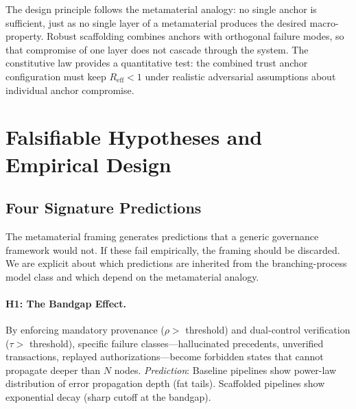 \documentclass[runningheads]{llncs}
\begin{document}
The design principle follows the metamaterial analogy: no single anchor is sufficient, just as no single layer of a metamaterial produces the desired macro-property. Robust scaffolding combines anchors with orthogonal failure modes, so that compromise of one layer does not cascade through the system. The constitutive law provides a quantitative test: the combined trust anchor configuration must keep $R_{\mathrm{eff}} < 1$ under realistic adversarial assumptions about individual anchor compromise.


\section{Falsifiable Hypotheses and Empirical Design}
\label{sec:empirical}

\subsection{Four Signature Predictions}

The metamaterial framing generates predictions that a generic governance framework would not. If these fail empirically, the framing should be discarded. We are explicit about which predictions are inherited from the branching-process model class and which depend on the metamaterial analogy.

\paragraph{H1: The Bandgap Effect.}
By enforcing mandatory provenance ($\rho >$ threshold) and dual-control verification ($\tau >$ threshold), specific failure classes---hallucinated precedents, unverified transactions, replayed authorizations---become forbidden states that cannot propagate deeper than $N$ nodes. \emph{Prediction}: Baseline pipelines show power-law distribution of error propagation depth (fat tails). Scaffolded pipelines show exponential decay (sharp cutoff at the bandgap).
\end{document}
